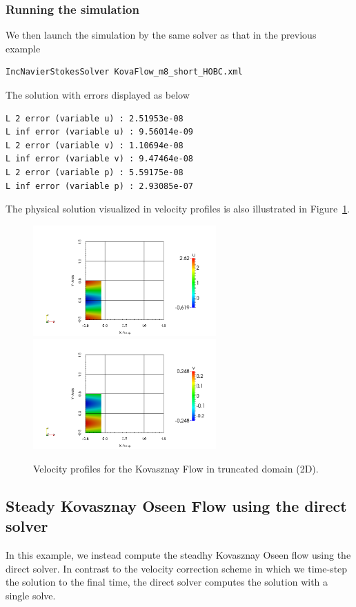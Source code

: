 \subsubsection{Running the simulation}
We then launch the simulation by the same solver as that in the previous example
\begin{lstlisting}[style=BashInputStyle]
IncNavierStokesSolver KovaFlow_m8_short_HOBC.xml
\end{lstlisting} 
 The solution with errors displayed as below
\begin{lstlisting}[style=BashInputStyle]
L 2 error (variable u) : 2.51953e-08
L inf error (variable u) : 9.56014e-09
L 2 error (variable v) : 1.10694e-08
L inf error (variable v) : 9.47464e-08
L 2 error (variable p) : 5.59175e-08
L inf error (variable p) : 2.93085e-07
\end{lstlisting}

The physical solution visualized in velocity profiles is also illustrated in 
Figure~\ref{f:incns:kovaflow2d_hobc}.

\begin{figure}
\begin{center}
\includegraphics[width=7cm]{img/KF2DCVP8HOBC_U.png}
\includegraphics[width=7cm]{img/KF2DCVP8HOBC_V.png}
\caption{Velocity profiles for the Kovasznay Flow in truncated domain (2D).}
\label{f:incns:kovaflow2d_hobc}
\end{center}
\end{figure}

\subsection{Steady Kovasznay Oseen Flow using the direct solver}
\label{s:incns:kovasznay2Ddirect}
In this example, we instead compute the steadhy Kovasznay Oseen flow
using the direct solver. In contrast to the velocity correction scheme in which
we time-step the solution to the final time, the direct solver computes the
solution with a single solve.

